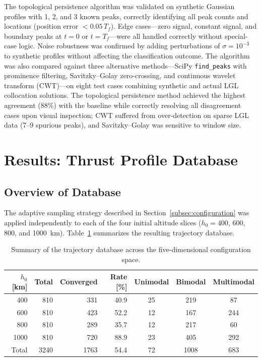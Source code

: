 \documentclass[a4paper,fleqn]{cas-dc}
\let\origsubsection\subsection
\renewcommand{\subsection}{\FloatBarrier\origsubsection}
\begin{document}
The topological persistence algorithm was validated on synthetic Gaussian profiles with 1, 2, and 3 known peaks, correctly identifying all peak counts and locations (position error $< 0.05\,T_f$). Edge cases---zero signal, constant signal, and boundary peaks at $t = 0$ or $t = T_f$---were all handled correctly without special-case logic. Noise robustness was confirmed by adding perturbations of $\sigma = 10^{-3}$ to synthetic profiles without affecting the classification outcome. The algorithm was also compared against three alternative methods---SciPy \texttt{find\_peaks} with prominence filtering, Savitzky--Golay zero-crossing, and continuous wavelet transform (CWT)---on eight test cases combining synthetic and actual LGL collocation solutions. The topological persistence method achieved the highest agreement (88\%) with the baseline while correctly resolving all disagreement cases upon visual inspection; CWT suffered from over-detection on sparse LGL data (7--9 spurious peaks), and Savitzky--Golay was sensitive to window size.


\section{Results: Thrust Profile Database}\label{sec:results_database}

\subsection{Overview of Database}\label{subsec:database_overview}

The adaptive sampling strategy described in Section~\ref{subsec:configuration} was applied independently to each of the four initial altitude slices ($h_0 = 400$, 600, 800, and 1000~km). Table~\ref{tab:db_summary} summarizes the resulting trajectory database.

\begin{table}[ht]
\centering
\caption{Summary of the trajectory database across the five-dimensional configuration space.}
\label{tab:db_summary}
\begin{tabular}{rrrrccc}
\hline
$h_0$ [km] & Total & Converged & Rate [\%] & Unimodal & Bimodal & Multimodal \\
\hline
400 & 810 & 331 & 40.9 & 25 & 219 & 87 \\
600 & 810 & 423 & 52.2 & 12 & 167 & 244 \\
800 & 810 & 289 & 35.7 & 12 & 217 & 60 \\
1000 & 810 & 720 & 88.9 & 23 & 405 & 292 \\
\hline
Total & 3240 & 1763 & 54.4 & 72 & 1008 & 683 \\
\hline
\end{tabular}
\end{table}
\end{document}
